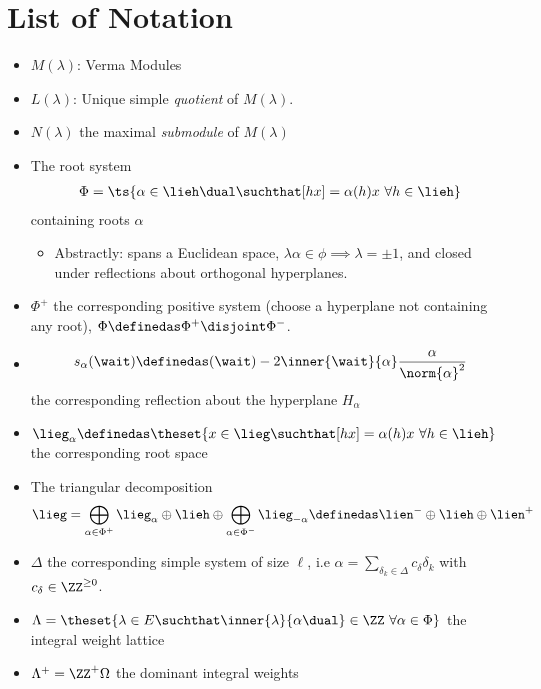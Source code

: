 \hypertarget{list-of-notation}{%
\section{List of Notation}\label{list-of-notation}}

\begin{itemize}
\item
  \(M(\lambda)\): Verma Modules
\item
  \(L(\lambda)\): Unique simple \emph{quotient} of \(M(\lambda)\).
\item
  \(N(\lambda)\) the maximal \emph{submodule} of \(M(\lambda)\)
\item
  The root system
  \begin{align*}\Phi = \ts{\alpha \in \lieh\dual \suchthat [hx] = \alpha(h)x ~\forall h\in \lieh}\end{align*}
  containing roots \(\alpha\)

  \begin{itemize}
  \tightlist
  \item
    Abstractly: spans a Euclidean space,
    \(\lambda \alpha \in \phi \implies \lambda = \pm 1\), and closed
    under reflections about orthogonal hyperplanes.
  \end{itemize}
\item
  \(\Phi^+\) the corresponding positive system (choose a hyperplane not
  containing any root), \(\Phi \definedas \Phi^+ \disjoint \Phi^-\).
\item

  \begin{align*}s_\alpha(\wait) \definedas(\wait) - 2\inner{\wait}{\alpha} \frac{\alpha}{\norm{\alpha}^2}\end{align*}
  the corresponding reflection about the hyperplane \(H_\alpha\)
\item
  \(\lieg_\alpha \definedas \theset{x\in \lieg \suchthat [hx] = \alpha(h)x ~\forall h\in \lieh}\)
  the corresponding root space
\item
  The triangular decomposition
  \begin{align*}\lieg = \bigoplus_{\alpha\in \Phi^+} \lieg_{\alpha} \oplus \lieh \oplus \bigoplus_{\alpha \in \Phi^-} \lieg_{-\alpha} \definedas \lien^{-} \oplus \lieh \oplus \lien^{+}\end{align*}
\item
  \(\Delta\) the corresponding simple system of size \(\ell\), i.e
  \(\alpha = \sum_{\delta_k \in\Delta} c_\delta \delta_k\) with
  \(c_\delta \in \ZZ^{\geq 0}\).
\item
  \(\Lambda = \theset{\lambda \in E \suchthat \inner{\lambda}{\alpha\dual} \in \ZZ ~\forall \alpha\in\Phi }\)
  the integral weight lattice
\item
  \(\Lambda^+ = \ZZ^+\Omega\) the dominant integral weights


\end{itemize}

